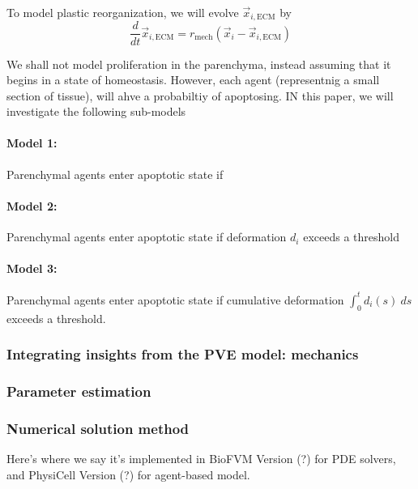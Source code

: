 \documentclass[smallextended,natbib]{svjour3}
\newcommand{\beq}{\begin{equation}}
\newcommand{\eeq}{\end{equation}}
\begin{document}
To model plastic reorganization, we will evolve $\vec{x}_{i,\textrm{ECM}}$ by 
\beq
\frac{d}{dt} \vec{x}_{i,\textrm{ECM}} = r_\textrm{mech} \left( \vec{x}_{i} - \vec{x}_{i,\textrm{ECM}} \right)
\eeq

We shall not model proliferation in the parenchyma, instead assuming that it begins in a state of homeostasis. 
However, each agent (representnig a small section of tissue), will ahve a probabiltiy of apoptosing. 
IN this paper, we will investigate the following sub-models 

\paragraph{Model 1:} Parenchymal agents enter apoptotic state if 

\paragraph{Model 2:} Parenchymal agents enter apoptotic state if deformation $d_i$ exceeds a threshold 

\paragraph{Model 3:} Parenchymal agents enter apoptotic state if cumulative deformation 
$\int_0^t d_i(s)\: ds$ exceeds a threshold. 




\subsubsection{Integrating insights from the PVE model: mechanics}





\subsubsection{Parameter estimation}

\subsubsection{Numerical solution method} Here's where we say it's implemented in 
BioFVM Version (?) for PDE solvers, and PhysiCell Version (?) for agent-based model. 
\end{document}
